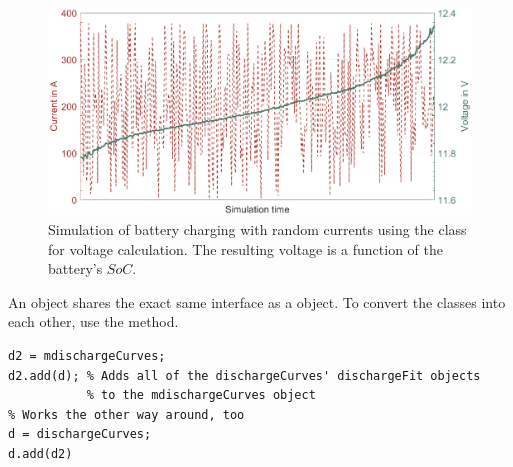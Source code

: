 \begin{figure}[b!]
	\captionsetup{type=figure}
	\centering
	\includegraphics[width=\textwidth]{mdischargeCurves}
	\caption[Simulation of battery charging with random currents using the  class for voltage calculation]{Simulation of battery charging with random currents using the  class for voltage calculation. The resulting voltage is a function of the battery's $SoC$.}
	\label{fig:mdischargeCurves}
\end{figure}
\clearpage
An  object shares the exact same interface as a  object. To convert the classes into each other, use the  method.
\begin{lstlisting}
d2 = mdischargeCurves;
d2.add(d); % Adds all of the dischargeCurves' dischargeFit objects
		   % to the mdischargeCurves object
% Works the other way around, too
d = dischargeCurves;
d.add(d2)
\end{lstlisting}

